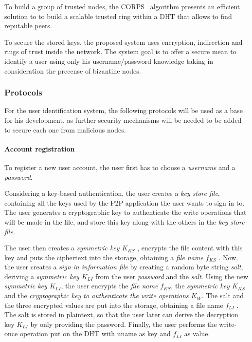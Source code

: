 \documentclass[12pt,spanish]{article}
\begin{document}
To build a group of trusted nodes, the CORPS~\cite{rosas2011corps} algorithm
presents an efficient solution to to build a scalable
trusted ring within a DHT that allows to find reputable
peers.


To secure the stored keys, the proposed system uses encryption, indirection and
rings of trust inside the network. The system goal is to offer a secure mean to
identify a user using only his username/password knowledge taking in
consideration the precense of bizantine nodes.

\subsubsection{Protocols}
For the user identification system, the following protocols will be used as a
base for his development, as further security mechanisms will be needed to be
added to secure each one from malicious nodes.

\paragraph{Account registration}

To register a new user account, the user first
has to choose a \textit{username} and a \textit{password}.

Considering a key-based authentication, the user creates a \textit{key store file}, containing all the
keys used by the P2P application the user wants to sign in to.
The user generates a cryptographic key to authenticate the write operations
that will be made in the file, and store this key along with the others in the
\textit{key store file}.


The user then creates a \textit{symmetric key $K_{KS}$} ,
encrypts the file content with this key and puts the ciphertext
into the storage, obtaining a \textit{file name $f_{KS}$} . Now, the user
creates a \textit{sign in information file} by creating a random
byte string \textit{salt}, deriving a \textit{symmetric key $K_{LI}$} from the user
\textit{password} and the \textit{salt}.
Using the new \textit{ symmetric key $K_{LI}$}, the user encrypts the
\textit{file name $f_{KS}$},
the \textit{symmetric key $K_{KS}$} and the \textit{cryptographic key to
authenticate the write operations $K_W$}.
 The salt and the three encrypted values are put
into the storage, obtaining a file name $f_{LI}$ . The salt is stored
in plaintext, so that the user later can derive the decryption
key $K_{LI}$ by only providing the password. Finally, the user
performs the write-once operation put on the DHT with
uname as key and $f_{LI}$ as value.
\end{document}
